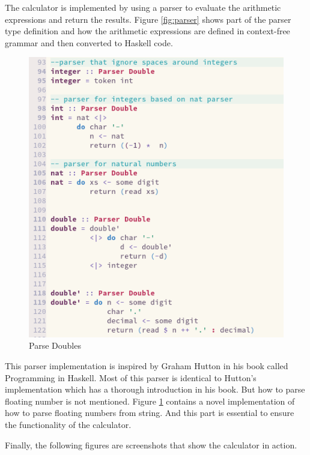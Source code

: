 \documentclass{article}
\begin{document}
\begin{normalsize}
  The calculator is implemented by using a parser to evaluate the arithmetic expressions and return the results. Figure \ref{fig:parser} shows part of the parser type definition and how the arithmetic expressions are defined in context-free grammar and then converted to Haskell code.

  \begin{figure}[H]
    \centering
    \centerline{\includegraphics[scale=0.8]{parserDouble}}
    \caption{Parse Doubles}
    \label{fig:parseDouble}
  \end{figure}

  This parser implementation is inspired by Graham Hutton in his book called Programming in Haskell. Most of this parser is identical to Hutton's implementation which has a thorough introduction in his book. But how to parse floating number is not mentioned. Figure \ref{fig:parseDouble} contains a novel implementation
  of how to parse floating numbers from string. And this part is essential to ensure the functionality of the calculator.

  Finally, the following figures are screenshots that show the calculator in action.


\end{normalsize}
\end{document}
